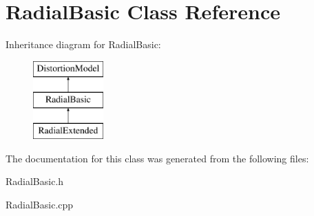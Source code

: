 \hypertarget{classRadialBasic}{
\section{RadialBasic Class Reference}
\label{classRadialBasic}
}
Inheritance diagram for RadialBasic:\begin{figure}[H]
\begin{center}
\leavevmode
\includegraphics[height=3.000000cm]{classRadialBasic}
\end{center}
\end{figure}


The documentation for this class was generated from the following files:\begin{DoxyCompactItemize}
\item 
RadialBasic.h\item 
RadialBasic.cpp\end{DoxyCompactItemize}
